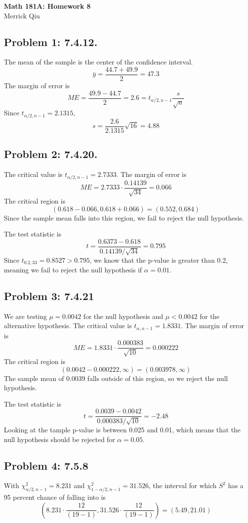 \documentclass{article}
\begin{document}
\begin{center}
	\huge{\bf Math 181A: Homework 8} \\
	Merrick Qiu 
\end{center}

\subsection*{Problem 1: 7.4.12.}
The mean of the sample is the center of the confidence interval.
\[
	\bar{y} = \frac{44.7+49.9}{2} = 47.3
\]
The margin of error is 
\[
	ME = \frac{49.9-44.7}{2} = 2.6 = t_{\alpha/2, n-1}\frac{s}{\sqrt{n}}
\]
Since $t_{\alpha/2, n-1} = 2.1315$,
\[
	s = \frac{2.6}{2.1315}\sqrt{16} = 4.88
\]
\newpage 

\subsection*{Problem 2: 7.4.20.}
The critical value is $t_{\alpha/2, n-1} = 2.7333$.
The margin of error is 
\[
	ME = 2.7333\cdot \frac{0.14139}{\sqrt{34}} = 0.066
\]
The critical region is 
\[
	(0.618-0.066, 0.618+0.066) = (0.552, 0.684)
\]
Since the sample mean falls into this region, we fail to reject the null hypothesis.


The test statistic is 
\[
	t = \frac{0.6373 - 0.618}{0.14139/\sqrt{34}} = 0.795	
\]
Since $t_{0.2, 33} = 0.8527 > 0.795$, we know that the p-value is greater than 0.2,
meaning we fail to reject the null hypothesis if $\alpha = 0.01$.
\newpage 

\subsection*{Problem 3: 7.4.21}
We are testing $\mu = 0.0042$ for the null hypothesis
and $\mu < 0.0042$ for the alternative hypothesis.
The critical value is $t_{\alpha, n-1} = 1.8331$.
The margin of error is 
\[
	ME = 1.8331\cdot \frac{0.000383}{\sqrt{10}} = 0.000222
\]
The critical region is 
\[
	(0.0042-0.000222, \infty) = (0.003978, \infty)
\]
The sample mean of $0.0039$ falls outside of this region, so 
we reject the null hypothesis.

The test statistic is 
\[
	t = \frac{0.0039 - 0.0042}{0.000383/\sqrt{10}} = -2.48 
\]
Looking at the tample p-value is between 0.025 and 0.01, which means
that the null hypothesis should be rejected for $\alpha = 0.05$.
\newpage 

\subsection*{Problem 4: 7.5.8}
With $\chi_{\alpha/2,n-1}^2 = 8.231$ and $\chi_{1-\alpha/2,n-1}^2 = 31.526$,
the interval for which $S^2$ has a 95 percent chance of falling into is
\[
	\left(8.231\cdot \frac{12}{(19-1)}, 31.526\cdot \frac{12}{(19-1)}\right)
	= (5.49, 21.01)
\]
\newpage 
\end{document}
